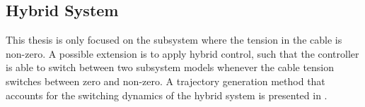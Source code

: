 \subsection{Hybrid System}
This thesis is only focused on the subsystem where the tension in the cable is non-zero. A possible extension is to apply hybrid control, such that the controller is able to switch between two subsystem models whenever the cable tension switches between zero and non-zero. 
A trajectory generation method that accounts for the switching dynamics of the hybrid system is presented in \cite{Tang2014}. 